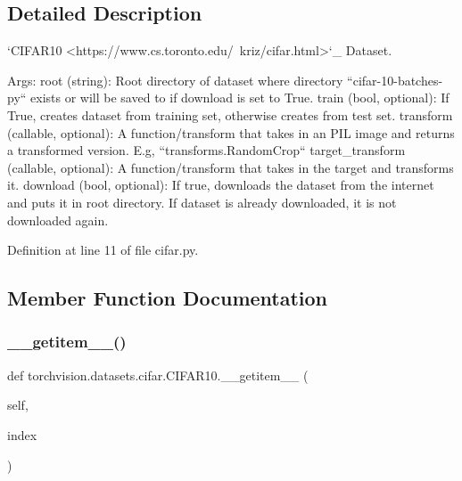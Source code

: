 \subsection{Detailed Description}
\begin{DoxyVerb}`CIFAR10 <https://www.cs.toronto.edu/~kriz/cifar.html>`_ Dataset.

Args:
    root (string): Root directory of dataset where directory
        ``cifar-10-batches-py`` exists or will be saved to if download is set to True.
    train (bool, optional): If True, creates dataset from training set, otherwise
        creates from test set.
    transform (callable, optional): A function/transform that takes in an PIL image
        and returns a transformed version. E.g, ``transforms.RandomCrop``
    target_transform (callable, optional): A function/transform that takes in the
        target and transforms it.
    download (bool, optional): If true, downloads the dataset from the internet and
        puts it in root directory. If dataset is already downloaded, it is not
        downloaded again.\end{DoxyVerb}
 

Definition at line 11 of file cifar.\+py.



\subsection{Member Function Documentation}
\mbox{\label{classtorchvision_1_1datasets_1_1cifar_1_1CIFAR10_a2f1865e00fdbf4e04f262008c2564895}} 
\subsubsection{\texorpdfstring{\+\_\+\+\_\+getitem\+\_\+\+\_\+()}{\_\_getitem\_\_()}}
{\footnotesize\ttfamily def torchvision.\+datasets.\+cifar.\+C\+I\+F\+A\+R10.\+\_\+\+\_\+getitem\+\_\+\+\_\+ (\begin{DoxyParamCaption}\item[{}]{self,  }\item[{}]{index }\end{DoxyParamCaption})}

